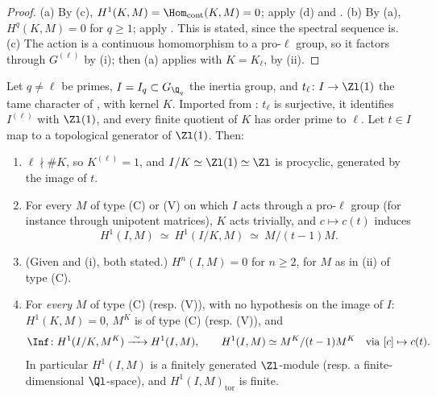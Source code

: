 \begin{proof}
(a) By (c), $H^1(K,M)=\Hom_{\mathrm{cont}}(K,M)=0$; apply (d) and .
(b) By (a), $H^q(K,M)=0$ for $q\ge1$; apply . This is stated, since the spectral sequence is.
(c) The action is a continuous homomorphism to a pro-$\ell$ group, so it factors through $G^{(\ell)}$ by (i); then (a) applies with
$K=K_\ell$, by (ii).
\end{proof}

\begin{proposition}\label{prop:cohomology:tame-inertia}
Let $q\ne\ell$ be primes, $I=I_q\subset G_{\Q_q}$ the inertia group, and $t_\ell\colon I\to\Zl(1)$ the tame character of , with kernel $K$. Imported
from : $t_\ell$ is surjective, it identifies $I^{(\ell)}$ with $\Zl(1)$, and every finite quotient of $K$ has order prime to $\ell$. Let $t\in I$ map
to a topological generator of $\Zl(1)$. Then:
\begin{enumerate}[label=(\roman*)]
\item $\ell\nmid\#K$, so $K^{(\ell)}=1$, and $I/K\simeq\Zl(1)\simeq\Zl$ is procyclic, generated by the image of $t$.
\item For every $M$ of type (C) or (V) on which $I$ acts through a pro-$\ell$ group (for instance through unipotent matrices), $K$ acts trivially, and
$c\mapsto c(t)$ induces
\[
H^1(I,M)\ \simeq\ H^1(I/K,M)\ \simeq\ M/(t-1)M .
\]
\item (Given  and (i), both stated.) $H^n(I,M)=0$ for $n\ge2$, for $M$ as in (ii) of type (C).
\item For \emph{every} $M$ of type (C) (resp. (V)), with no hypothesis on the image of $I$: $H^1(K,M)=0$, $M^K$ is of type (C) (resp. (V)), and
\[
\Inf\colon H^1(I/K,M^K)\xrightarrow{\ \sim\ }H^1(I,M),\qquad H^1(I,M)\simeq M^K/(t-1)M^K\quad\text{via }[c]\mapsto c(t).
\]
In particular $H^1(I,M)$ is a finitely generated $\Zl$-module (resp. a finite-dimensional $\Ql$-space), and $H^1(I,M)_{\mathrm{tor}}$ is finite.
\end{enumerate}
\end{proposition}

